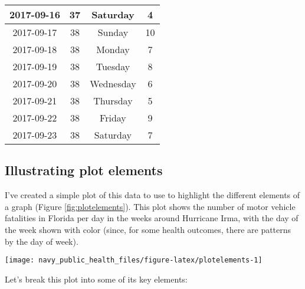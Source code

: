 \documentclass[]{tufte-book}
\begin{document}
\begin{table}[t]
\begin{tabular}{c|c|c|c}
\hline
2017-09-16 & 37 & Saturday & 4\\
\hline
2017-09-17 & 38 & Sunday & 10\\
\hline
2017-09-18 & 38 & Monday & 7\\
\hline
2017-09-19 & 38 & Tuesday & 8\\
\hline
2017-09-20 & 38 & Wednesday & 6\\
\hline
2017-09-21 & 38 & Thursday & 5\\
\hline
2017-09-22 & 38 & Friday & 9\\
\hline
2017-09-23 & 38 & Saturday & 7\\
\hline
\end{tabular}
\end{table}

\hypertarget{illustrating-plot-elements}{%
\subsection{Illustrating plot elements}\label{illustrating-plot-elements}}

I've created a simple plot of this data to use to highlight the different
elements of a graph (Figure \ref{fig:plotelements}). This plot shows the
number of motor vehicle fatalities
in Florida per day in the weeks around Hurricane Irma, with the day of the week shown
with color (since, for some health outcomes, there are patterns by the day
of week).

\begin{figure*}
\texttt{[image: navy\_public\_health\_files/figure-latex/plotelements-1]} \caption[Number of motor vehicle fatalities by day in Florida in the weeks surrounding Hurricane Irma on September 10, 2019]{Number of motor vehicle fatalities by day in Florida in the weeks surrounding Hurricane Irma on September 10, 2019.}\label{fig:plotelements}
\end{figure*}

Let's break this plot into some of its key elements:
\end{document}

